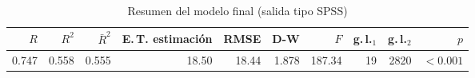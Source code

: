 \begin{table}[htbp]
\centering
\footnotesize
\caption{Resumen del modelo final (salida tipo SPSS)}\label{tab:spss-resumen}
\begin{tabular}{r r r r r r r r r r}
\toprule
$R$ & $R^2$ & $\bar R^2$ & E.\,T. estimación & RMSE & D-W & $F$ & g.\,l.$_1$ & g.\,l.$_2$ & $p$ \\
\midrule
\num{0.747} & \num{0.558} & \num{0.555} & \num{18.50} & \num{18.44} & \num{1.878} & \num{187.34} & \num{19} & \num{2820} & $<\num{0.001}$ \\
\bottomrule
\end{tabular}
\par{}
\end{table}
